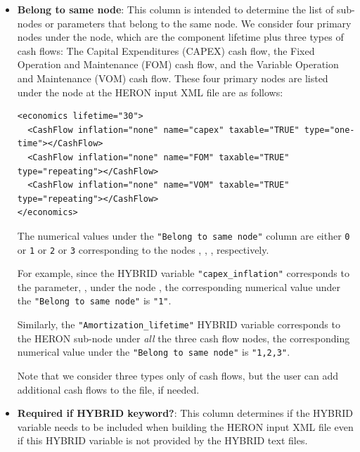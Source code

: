 \begin{itemize}
    \item \textbf{Belong to same node}: This column is intended to determine the list of sub-nodes or parameters that belong to the same node. We consider four primary nodes under the  node, which are the component lifetime plus three types of cash flows: The Capital Expenditures (CAPEX) cash flow, the Fixed Operation and Maintenance (FOM) cash flow, and the Variable Operation and Maintenance (VOM) cash flow. These four primary nodes are listed under the  node at the HERON input XML file are as follows:

\begin{minipage}{0.93\textwidth}
\begin{lstlisting}[style=XML,morekeywords={class}]
<economics lifetime="30">
  <CashFlow inflation="none" name="capex" taxable="TRUE" type="one-time"></CashFlow>
  <CashFlow inflation="none" name="FOM" taxable="TRUE" type="repeating"></CashFlow>
  <CashFlow inflation="none" name="VOM" taxable="TRUE" type="repeating"></CashFlow>
</economics>
\end{lstlisting}
\end{minipage} \par

The numerical values under the \verb|"Belong to same node"| column are either \verb|0| or \verb|1| or \verb|2| or \verb|3| corresponding to the nodes , , ,  respectively.

For example, since the HYBRID variable \verb|"capex_inflation"| corresponds to the parameter, , under the node , the corresponding numerical value under the \verb|"Belong to same node"| is \verb|"1"|.

Similarly, the \verb|"Amortization_lifetime"| HYBRID variable corresponds to the HERON sub-node  under \emph{all} the three cash flow nodes, the corresponding numerical value under the \verb|"Belong to same node"| is \verb|"1,2,3"|.

Note that we consider three types only of cash flows, but the user can add additional cash flows to the  file, if needed.

 \item \textbf{Required if HYBRID keyword?}: This column determines if the HYBRID variable needs to be included when building the HERON input XML file even if this HYBRID variable is not provided by the HYBRID text files.


\end{itemize}
